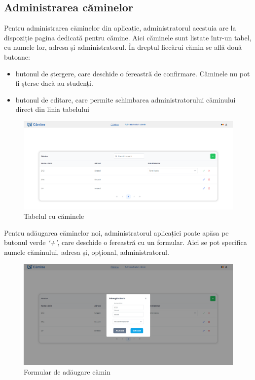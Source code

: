 \documentclass[12pt,a4paper]{report}
\theoremstyle{definition}
\theoremstyle{remark}
\begin{document}
\subsection{Administrarea căminelor}

\par Pentru administrarea căminelor din aplicație, administratorul acestuia are la \textnormal{dis\-po\-zi\-ți\-e} pagina dedicată pentru cămine. Aici căminele sunt listate într-un tabel, cu numele lor, adresa și administratorul. În dreptul fiecărui cămin se află două butoane:

\begin{itemize}
    \item butonul de ștergere, care deschide o fereastră de confirmare. Căminele nu pot fi șterse dacă au studenți.
    \item butonul de editare, care permite schimbarea administratorului căminului direct din linia tabelului
\end{itemize}

\begin{figure}[H]
    \centering
    \includegraphics[width=0.8\linewidth]{resurse/ghid_utilizare/editare_camine.png}
    \caption{Tabelul cu căminele}
\end{figure}

\par Pentru adăugarea căminelor noi, administratorul aplicației poate apăsa pe butonul verde \textit{`+'}, care deschide o fereastră cu un formular. Aici se pot specifica numele căminului, adresa și, opțional, administratorul.

\begin{figure}[H]
    \centering
    \includegraphics[width=0.8\linewidth]{resurse/ghid_utilizare/aduga_camin.png}
    \caption{Formular de adăugare cămin}
\end{figure}
\end{document}
